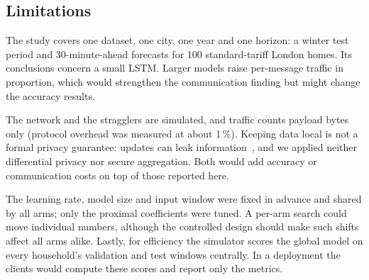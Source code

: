 \subsection{Limitations}
The study covers one dataset, one city, one year and one horizon: a winter test period and 30-minute-ahead forecasts
for 100 standard-tariff London homes. Its conclusions concern a small LSTM. Larger models raise per-message traffic in
proportion, which would strengthen the communication finding but might change the accuracy results.

The network and the stragglers are simulated, and traffic counts payload bytes only (protocol overhead was measured
at about 1\,\%). Keeping data local is not a formal privacy guarantee: updates can leak
information~\cite{zhu2019leakage,geiping2020inverting}, and we applied neither differential privacy nor secure
aggregation. Both would add accuracy or communication costs on top of those reported here.

The learning rate, model size and input window were fixed in advance and shared by all arms; only the proximal
coefficients were tuned. A per-arm search could move individual numbers, although the controlled design should make
such shifts affect all arms alike. Lastly, for efficiency the simulator scores the global model on every household's
validation and test windows centrally. In a deployment the clients would compute these scores and report only the
metrics.
